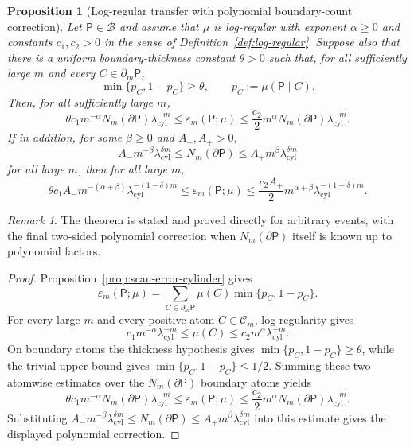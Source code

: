 \documentclass{etds}%
\numberwithin{equation}{section}
\theoremstyle{plain}
\newtheorem{proposition}[theorem]{Proposition}
\theoremstyle{definition}
\theoremstyle{remark}
\newtheorem{remark}[theorem]{Remark}
\begin{document}
\begin{proposition}[Log-regular transfer with polynomial boundary-count correction]
\label{prop:nonuniform-cylinder}
Let $\mathsf{P}\in\mathcal{B}$ and assume that $\mu$ is log-regular with
exponent $\alpha\ge0$ and constants $c_1,c_2>0$ in the sense of
Definition~\ref{def:log-regular}.  Suppose also that there is a uniform
boundary-thickness constant $\theta>0$ such that, for all sufficiently large
$m$ and every $C\in\partial_m\mathsf{P}$,
\[
\min\{p_C,1-p_C\}\ge\theta,
\qquad p_C:=\mu(\mathsf{P}\mid C).
\]
Then, for all sufficiently large $m$,
\[
\theta c_1m^{-\alpha}
N_m(\partial\mathsf{P})\lambda_{\mathrm{cyl}}^{-m}
\le \varepsilon_m(\mathsf{P};\mu)
\le \frac{c_2}{2}m^\alpha
N_m(\partial\mathsf{P})\lambda_{\mathrm{cyl}}^{-m}.
\]
If in addition, for some $\beta\ge 0$ and $A_-,A_+>0$,
\[
A_-m^{-\beta}\lambda_{\mathrm{cyl}}^{\delta m}
\le N_m(\partial\mathsf{P})
\le A_+m^\beta\lambda_{\mathrm{cyl}}^{\delta m}
\]
for all large $m$, then for all large $m$,
\[
\theta c_1A_-m^{-(\alpha+\beta)}\lambda_{\mathrm{cyl}}^{-(1-\delta)m}
\le\varepsilon_m(\mathsf{P};\mu)
\le \frac{c_2A_+}{2}m^{\alpha+\beta}\lambda_{\mathrm{cyl}}^{-(1-\delta)m}.
\]
\end{proposition}

\begin{remark}
The theorem is stated and proved directly for arbitrary events, with the final
two-sided polynomial correction when $N_m(\partial\mathsf{P})$ itself is known
up to polynomial factors.
\end{remark}

\begin{proof}
Proposition~\ref{prop:scan-error-cylinder} gives
\[
\varepsilon_m(\mathsf{P};\mu)
=\sum_{C\in\partial_m\mathsf{P}}\mu(C)\min\{p_C,1-p_C\}.
\]
For every large $m$ and every positive atom $C\in\mathcal{C}_m$,
log-regularity gives
\[
c_1m^{-\alpha}\lambda_{\mathrm{cyl}}^{-m}
\le \mu(C)\le
c_2m^\alpha\lambda_{\mathrm{cyl}}^{-m}.
\]
On boundary atoms the thickness hypothesis gives
$\min\{p_C,1-p_C\}\ge\theta$, while the trivial upper bound gives
$\min\{p_C,1-p_C\}\le1/2$.  Summing these two atomwise estimates over the
$N_m(\partial\mathsf{P})$ boundary atoms yields
\[
\theta c_1m^{-\alpha}
N_m(\partial\mathsf{P})\lambda_{\mathrm{cyl}}^{-m}
\le \varepsilon_m(\mathsf{P};\mu)
\le \frac{c_2}{2}m^\alpha
N_m(\partial\mathsf{P})\lambda_{\mathrm{cyl}}^{-m}.
\]
Substituting
$A_-m^{-\beta}\lambda_{\mathrm{cyl}}^{\delta m}\le
N_m(\partial\mathsf{P})\le
A_+m^\beta\lambda_{\mathrm{cyl}}^{\delta m}$
into this estimate gives the displayed polynomial correction.
\end{proof}
\end{document}
